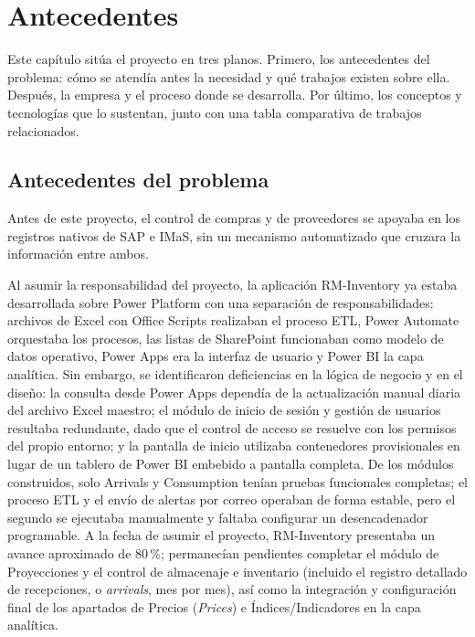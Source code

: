 
\section{Antecedentes} \label{sec:antecedentes}

Este capítulo sitúa el proyecto en tres planos. Primero, los antecedentes del problema: cómo se atendía antes la necesidad y qué trabajos existen sobre ella. Después, la empresa y el proceso donde se desarrolla. Por último, los conceptos y tecnologías que lo sustentan, junto con una tabla comparativa de trabajos relacionados.

\subsection{Antecedentes del problema} \label{sec:antecedentes_problema} %

Antes de este proyecto, el control de compras y de proveedores se apoyaba en los registros nativos de SAP e IMaS, sin un mecanismo automatizado que cruzara la información entre ambos.

Al asumir la responsabilidad del proyecto, la aplicación RM-Inventory ya estaba desarrollada sobre Power Platform con una separación de responsabilidades: archivos de Excel con Office Scripts realizaban el proceso ETL, Power Automate orquestaba los procesos, las listas de SharePoint funcionaban como modelo de datos operativo, Power Apps era la interfaz de usuario y Power BI la capa analítica. Sin embargo, se identificaron deficiencias en la lógica de negocio y en el diseño: la consulta desde Power Apps dependía de la actualización manual diaria del archivo Excel maestro; el módulo de inicio de sesión y gestión de usuarios resultaba redundante, dado que el control de acceso se resuelve con los permisos del propio entorno; y la pantalla de inicio utilizaba contenedores provisionales en lugar de un tablero de Power BI embebido a pantalla completa. De los módulos construidos, solo Arrivals y Consumption tenían pruebas funcionales completas; el proceso ETL y el envío de alertas por correo operaban de forma estable, pero el segundo se ejecutaba manualmente y faltaba configurar un desencadenador programable. 
A la fecha de asumir el proyecto, RM-Inventory presentaba un avance aproximado de 80\,\%; permanecían pendientes completar el módulo de Proyecciones y el control de almacenaje e inventario (incluido el registro detallado de recepciones, o \emph{arrivals}, mes por mes), así como la integración y configuración final de los apartados de Precios (\emph{Prices}) e Índices/Indicadores en la capa analítica.

